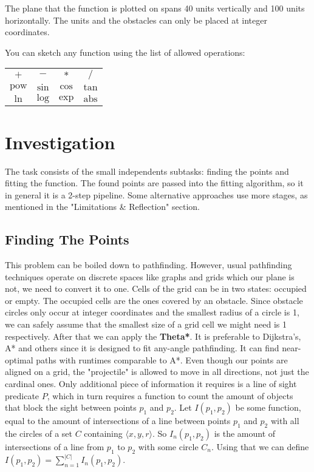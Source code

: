 \documentclass[12pt, titlepage]{article}
\begin{document}
The plane that the function is plotted on spans 40 units vertically and 
100 units horizontally. The units and the obstacles can only be placed at 
integer coordinates. 

You can sketch any function using the list of allowed 
operations:

{
\centering
\begin{tabular}{c c c c}
    $+$ & $-$ & $*$ & $/$ \\
    $\mathrm{pow}$ & $\mathrm{sin}$ & $\mathrm{cos}$ & $\mathrm{tan}$\\
    $\mathrm{ln}$ & $\mathrm{log}$ & $\mathrm{exp}$ & $\mathrm{abs}$\\
\end{tabular}\par
}

\section{Investigation}
The task consists of the small independents subtasks: finding the points and 
fitting the function. The found points are passed into the fitting algorithm,
so it in general it is a 2-step pipeline. Some alternative approaches use
more stages, as mentioned in the "Limitations \& Reflection" section. 

\subsection{Finding The Points}
This problem can be boiled down to pathfinding. However, usual pathfinding
techniques operate on discrete spaces like graphs and grids which our plane
is not, we need to convert it to one. Cells of the grid can be in two states:
occupied or empty. The occupied cells are the ones covered by an obstacle. 
Since obstacle circles only occur at integer coordinates and the smallest
radius of a circle is 1, we can safely assume that the smallest size of a grid
cell we might need is 1 respectively. After that we can apply the \textbf{Theta*}.
It is preferable to Dijkstra's, A* and others since it is designed to fit
any-angle pathfinding. It can find near-optimal paths with runtimes comparable
to A*. Even though our points are aligned on a grid,
the "projectile" is allowed to move in all directions, not just the cardinal ones. 
Only additional piece of information it requires is a line of sight predicate $P$,
which in turn requires a function to count the amount of objects that block the
sight between points $p_1$ and $p_2$.
Let $I(p_1, p_2)$ be some function, equal to the amount of intersections of a 
line between points $p_1$ and $p_2$  with all the circles of a set $C$ containing 
$\langle x, y, r \rangle$. So $I_n(p_1, p_2)$ is the amount of intersections
of a line from $p_1$ to $p_2$ with some circle $C_n$. 
Using that we can define $I(p_1, p_2) = \sum_{n=1}^{|C|}I_n(p_1, p_2)$.
\end{document}
